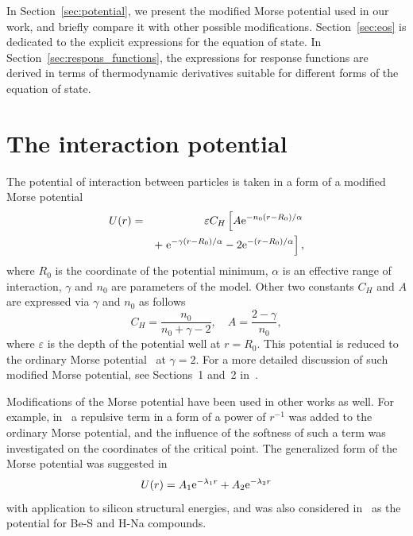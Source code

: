 \documentclass[fleqn,twoside,twocolumn,nofootinbib,showkeys]{revtex4} %
\begin{document}
	In Section~\ref{sec:potential}, we present the modified Morse potential used in our work, and briefly compare it with other possible modifications. Section~\ref{sec:eos} is dedicated to the explicit expressions for the equation of state. In Section~\ref{sec:respons_functions}, the expressions for response functions are derived in terms of thermodynamic derivatives suitable for different forms of the equation of state.
	
	
	\section{\label{sec:potential}The interaction potential}
	The potential of interaction between particles is taken in a form of a modified Morse potential
	\begin{eqnarray}
		\label{def:mod_morse}
		U(r) & = & \varepsilon C_{H} \left[A {\rm e}^{-n_0(r-R_0)/\alpha} \right.
		\nonumber\\
		&& + \left. {\rm e}^{-\gamma(r - R_0)/\alpha} -2{\rm e}^{-(r-R_0)/\alpha}\right],
	\end{eqnarray}
	where $R_0$ is the coordinate of the potential minimum, $\alpha$ is an effective range of interaction, $\gamma$ and $n_0$ are parameters of the model. Other two constants $C_{H}$ and $A$ are expressed via $\gamma$ and $n_0$ as follows
	\begin{equation}
		C_{H} = \frac{n_0}{n_0 + \gamma - 2}, \quad A = \frac{2 - \gamma}{n_0},
	\end{equation}
	where $\varepsilon$ is the depth of the potential well at $r=R_0$. This potential is reduced to the ordinary Morse potential~\cite{Morse1929} at $\gamma=2$. For a more detailed discussion of such modified Morse potential, see Sections~1 and~2 in~\cite{KozlovskiiDobush2020}.
	
	Modifications of the Morse potential have been used in other works as well. For example, in~\cite{MartinezValenciaEtAl2013} a repulsive term in a form of a power of $r^{-1}$ was added to the ordinary Morse potential, and the influence of the softness of such a term was investigated on the coordinates of the critical point. The generalized form of the Morse potential was suggested in~\cite{BiswasHamann1985}
	\begin{equation}
		U(r) = A_1 {\rm e}^{-\lambda_1 r} + A_2 {\rm e}^{-\lambda_2 r}
	\end{equation} 
	with application to silicon structural energies, and was also considered in~\cite{Lim2005} as the potential for Be-S and H-Na compounds.
	
\end{document}
